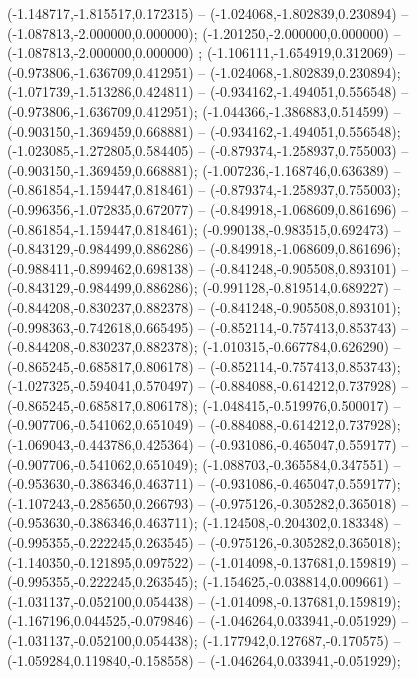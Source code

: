  (-1.148717,-1.815517,0.172315) -- (-1.024068,-1.802839,0.230894) -- (-1.087813,-2.000000,0.000000);
 (-1.201250,-2.000000,0.000000) -- (-1.087813,-2.000000,0.000000) ;
 (-1.106111,-1.654919,0.312069) -- (-0.973806,-1.636709,0.412951) -- (-1.024068,-1.802839,0.230894);
 (-1.071739,-1.513286,0.424811) -- (-0.934162,-1.494051,0.556548) -- (-0.973806,-1.636709,0.412951);
 (-1.044366,-1.386883,0.514599) -- (-0.903150,-1.369459,0.668881) -- (-0.934162,-1.494051,0.556548);
 (-1.023085,-1.272805,0.584405) -- (-0.879374,-1.258937,0.755003) -- (-0.903150,-1.369459,0.668881);
 (-1.007236,-1.168746,0.636389) -- (-0.861854,-1.159447,0.818461) -- (-0.879374,-1.258937,0.755003);
 (-0.996356,-1.072835,0.672077) -- (-0.849918,-1.068609,0.861696) -- (-0.861854,-1.159447,0.818461);
 (-0.990138,-0.983515,0.692473) -- (-0.843129,-0.984499,0.886286) -- (-0.849918,-1.068609,0.861696);
 (-0.988411,-0.899462,0.698138) -- (-0.841248,-0.905508,0.893101) -- (-0.843129,-0.984499,0.886286);
 (-0.991128,-0.819514,0.689227) -- (-0.844208,-0.830237,0.882378) -- (-0.841248,-0.905508,0.893101);
 (-0.998363,-0.742618,0.665495) -- (-0.852114,-0.757413,0.853743) -- (-0.844208,-0.830237,0.882378);
 (-1.010315,-0.667784,0.626290) -- (-0.865245,-0.685817,0.806178) -- (-0.852114,-0.757413,0.853743);
 (-1.027325,-0.594041,0.570497) -- (-0.884088,-0.614212,0.737928) -- (-0.865245,-0.685817,0.806178);
 (-1.048415,-0.519976,0.500017) -- (-0.907706,-0.541062,0.651049) -- (-0.884088,-0.614212,0.737928);
 (-1.069043,-0.443786,0.425364) -- (-0.931086,-0.465047,0.559177) -- (-0.907706,-0.541062,0.651049);
 (-1.088703,-0.365584,0.347551) -- (-0.953630,-0.386346,0.463711) -- (-0.931086,-0.465047,0.559177);
 (-1.107243,-0.285650,0.266793) -- (-0.975126,-0.305282,0.365018) -- (-0.953630,-0.386346,0.463711);
 (-1.124508,-0.204302,0.183348) -- (-0.995355,-0.222245,0.263545) -- (-0.975126,-0.305282,0.365018);
 (-1.140350,-0.121895,0.097522) -- (-1.014098,-0.137681,0.159819) -- (-0.995355,-0.222245,0.263545);
 (-1.154625,-0.038814,0.009661) -- (-1.031137,-0.052100,0.054438) -- (-1.014098,-0.137681,0.159819);
 (-1.167196,0.044525,-0.079846) -- (-1.046264,0.033941,-0.051929) -- (-1.031137,-0.052100,0.054438);
 (-1.177942,0.127687,-0.170575) -- (-1.059284,0.119840,-0.158558) -- (-1.046264,0.033941,-0.051929);
